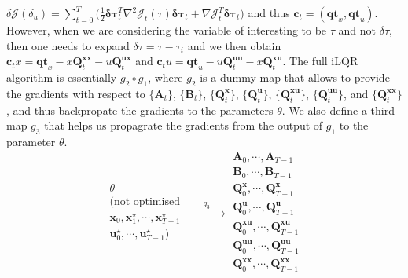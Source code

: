 \documentclass[a4paper,11pt]{article}
\renewcommand\b\bm
\begin{document}
$\delta\mathcal{J} (\delta_u) =  \sum_{t=0}^{T} \big (\frac{1}{2} \bm{\delta\tau}_t^T \nabla^2 \mathcal{J}_t (\tau) \b{\delta\tau}_t + \nabla \mathcal{J}_t^T \b{\delta\tau}_t \big )$
and thus $\b{c}_t = (\b{qt}_x, \b{qt}_u)$. However, when we are considering the variable of interesting to be $\tau$ and not $\delta\tau$, then one needs
to expand $\delta\tau = \tau-\tau_i$ and we then obtain $\b{c}_tx =   \b{qt}_x -  x\b{Q}_t^{\b{xx}} - u \b{Q}_t^{\b{ux}}$
and $\b{c}_tu =   \bm{qt}_u -  u\b{Q}_t^{\b{uu}} - x \b{Q}_t^{\b{xu}}$.
The full iLQR algorithm is essentially $g_2 \circ g_1$, where $g_2$ is a dummy map that allows to provide the gradients with respect to $\{\b{A}_t\}$, $\{\b{B}_t\}$, $\{\b{Q}^{\b{x}}_t\}$, $\{\b{Q}^{\b{u}}_t\}$, $\{\b{Q}^{\b{xu}}_t\}$, $\{\b{Q}^{\b{uu}}_t\}$, and $\{\b{Q}^{\b{xx}}_t\}$, and thus backpropate the gradients to the parameters $\theta$.
We also define a third map $g_3$ that helps us propagrate the gradients from the output of $g_1$ to the parameter $\theta$.
%
\begin{equation}
    \begin{aligned}
        \theta                                            \\
        (\text{not optimised}                             \\
        \b{x}_0, \b{x}^\star_1, \cdots, \b{x}^\star_{T-1} \\
        \b{u}^\star_0, \cdots, \b{u}^\star_{T-1})         \\
    \end{aligned}
    \xrightarrow{\qquad g_3 \qquad}
    \begin{aligned}
        \b{A}_{0}, \cdots, \b{A}_{T-1}                   \\
        \b{B}_{0}, \cdots, \b{B}_{T-1}                   \\
        \b{Q}_{0}^{\b{x}}, \cdots, \b{Q}_{T-1}^{\b{x}}   \\
        \b{Q}_{0}^{\b{u}}, \cdots, \b{Q}_{T-1}^{\b{u}}   \\
        \b{Q}_{0}^{\b{xu}}, \cdots, \b{Q}_{T-1}^{\b{xu}} \\
        \b{Q}_{0}^{\b{uu}}, \cdots, \b{Q}_{T-1}^{\b{uu}} \\
        \b{Q}_{0}^{\b{xx}}, \cdots, \b{Q}_{T-1}^{\b{xx}} \\
    \end{aligned}
\end{equation}
\end{document}
